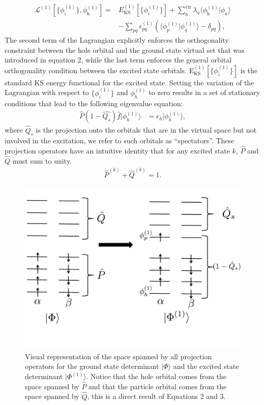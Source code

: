 \documentclass[11.5pt]{article}
\begin{document}
\begin{align}
\nonumber \mathcal{L}^{(1)}[\{\phi_i^{(1)}\}, \phi^{(1)}_{\text{h}}] = &E^{(1)}_{\text{KS}}[\{\phi_i^{(1)}\}] + \sum_a^{\text{vir}} \lambda_a \langle \phi^{(1)}_{\text{h}}|\phi_a\rangle  \\ 
&- \sum_{pq} \epsilon^{(1)}_{pq} (\langle \phi^{(1)}_{p}|\phi_q^{(1)}\rangle - \delta_{pq}) ,
\end{align}
The second term of the Lagrangian explicitly enforces the orthogonality constraint between the hole orbital and the ground state virtual set that was introduced in equation 2, while the last term enforces the general orbital orthogonality condition between the excited state orbitals. E$^{(1)}_{\text{KS}}[\{\phi_i^{(1)}\}]$ is the standard KS energy functional for the excited state. Setting the variation of the Lagrangian with respect to $\{\phi^{(1)}_i\}$ and $\phi^{(1)}_h$ to zero results in a set of stationary conditions that lead to the following eigenvalue equation:
\begin{align}
\hat{P}(1-\hat{Q_s}) \hat{f} |\phi_h^{(1)}\rangle &= \epsilon_h |\phi_h^{(1)}\rangle ,
\end{align}
where $\hat{Q}_s$ is the projection onto the orbitals that are in the virtual space but not involved in the excitation, we refer to such orbitals as ``spectators''. 
These projection operators have an intuitive identity that  for any excited state $k$, $\hat{P}$ and $\hat{Q}$  must sum to unity.
\begin{align}
\hat{P}^{(k)} + \hat{Q}^{(k)} = 1 .
\end{align}
\begin{figure}
\includegraphics[scale=0.35]{Figure1.pdf}
\caption{Visual representation of the space spanned by all projection operators for the ground state determinant $|\Phi\rangle$ and the excited state determinant $|\Phi^{(1)}\rangle$. Notice that the hole orbital comes from the space spanned by $\hat{P}$ and that the particle orbital comes from the space spanned by  $\hat{Q}$, this is a direct result of Equations 2 and 3.}
\end{figure}
\end{document}
